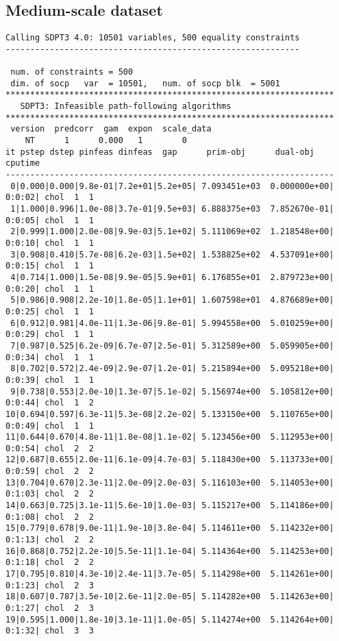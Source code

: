 \documentclass[11pt,a4paper]{report}
\begin{document}
\subsection{Medium-scale dataset}
\begin{verbatim}
Calling SDPT3 4.0: 10501 variables, 500 equality constraints
------------------------------------------------------------

 num. of constraints = 500
 dim. of socp   var  = 10501,   num. of socp blk  = 5001
*******************************************************************
   SDPT3: Infeasible path-following algorithms
*******************************************************************
 version  predcorr  gam  expon  scale_data
    NT      1      0.000   1        0    
it pstep dstep pinfeas dinfeas  gap      prim-obj      dual-obj    cputime
-------------------------------------------------------------------
 0|0.000|0.000|9.8e-01|7.2e+01|5.2e+05| 7.093451e+03  0.000000e+00| 0:0:02| chol  1  1 
 1|1.000|0.996|1.0e-08|3.7e-01|9.5e+03| 6.888375e+03  7.852670e-01| 0:0:05| chol  1  1 
 2|0.999|1.000|2.0e-08|9.9e-03|5.1e+02| 5.111069e+02  1.218548e+00| 0:0:10| chol  1  1 
 3|0.908|0.410|5.7e-08|6.2e-03|1.5e+02| 1.538825e+02  4.537091e+00| 0:0:15| chol  1  1 
 4|0.714|1.000|1.5e-08|9.9e-05|5.9e+01| 6.176855e+01  2.879723e+00| 0:0:20| chol  1  1 
 5|0.986|0.908|2.2e-10|1.8e-05|1.1e+01| 1.607598e+01  4.876689e+00| 0:0:25| chol  1  1 
 6|0.912|0.981|4.0e-11|1.3e-06|9.8e-01| 5.994558e+00  5.010259e+00| 0:0:29| chol  1  1 
 7|0.987|0.525|6.2e-09|6.7e-07|2.5e-01| 5.312589e+00  5.059905e+00| 0:0:34| chol  1  1 
 8|0.702|0.572|2.4e-09|2.9e-07|1.2e-01| 5.215894e+00  5.095218e+00| 0:0:39| chol  1  1 
 9|0.738|0.553|2.0e-10|1.3e-07|5.1e-02| 5.156974e+00  5.105812e+00| 0:0:44| chol  1  2 
10|0.694|0.597|6.3e-11|5.3e-08|2.2e-02| 5.133150e+00  5.110765e+00| 0:0:49| chol  1  1 
11|0.644|0.670|4.8e-11|1.8e-08|1.1e-02| 5.123456e+00  5.112953e+00| 0:0:54| chol  2  2 
12|0.687|0.655|2.0e-11|6.1e-09|4.7e-03| 5.118430e+00  5.113733e+00| 0:0:59| chol  2  2 
13|0.704|0.670|2.3e-11|2.0e-09|2.0e-03| 5.116103e+00  5.114053e+00| 0:1:03| chol  2  2 
14|0.663|0.725|3.1e-11|5.6e-10|1.0e-03| 5.115217e+00  5.114186e+00| 0:1:08| chol  2  2 
15|0.779|0.678|9.0e-11|1.9e-10|3.8e-04| 5.114611e+00  5.114232e+00| 0:1:13| chol  2  2 
16|0.868|0.752|2.2e-10|5.5e-11|1.1e-04| 5.114364e+00  5.114253e+00| 0:1:18| chol  2  2 
17|0.795|0.810|4.3e-10|2.4e-11|3.7e-05| 5.114298e+00  5.114261e+00| 0:1:23| chol  2  3 
18|0.607|0.787|3.5e-10|2.6e-11|2.0e-05| 5.114282e+00  5.114263e+00| 0:1:27| chol  2  3 
19|0.595|1.000|1.8e-10|3.1e-11|1.0e-05| 5.114274e+00  5.114264e+00| 0:1:32| chol  3  3 

\end{verbatim}
\end{document}
